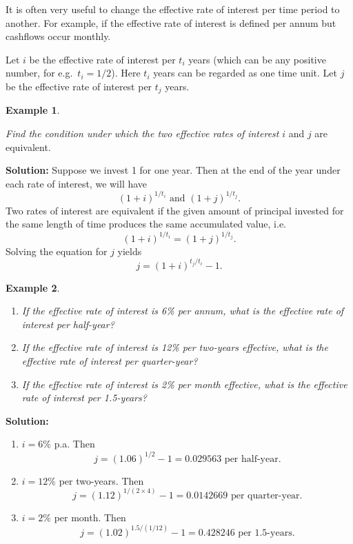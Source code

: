 \documentclass[landscape, 20pt]{extreport}
\theoremstyle{definition}
\theoremstyle{definition}
\newtheorem{example}{Example}[chapter]
\theoremstyle{definition}
\theoremstyle{definition}
\theoremstyle{remark}
\begin{document}
It is often very useful to change the effective rate of interest per
time period to another. For example, if the effective rate of interest
is defined per annum but cashflows occur monthly.

Let \(i\) be the effective rate of interest per \(t_i\) years (which can be
any positive number, for e.g.~\(t_i = 1/2\)). Here \(t_i\) years can be
regarded as one time unit. Let \(j\) be the effective rate of interest per
\(t_j\) years.

\newpage \begin{example}
\protect\hypertarget{exm:unlabeled-div-17}{}\label{exm:unlabeled-div-17}

\emph{Find the condition under which the two effective rates of interest} \(i\)
and \(j\) are equivalent.

\end{example}

\textbf{Solution:} Suppose we invest 1 for one year. Then at the end of the
year under each rate of interest, we will have
\[(1+i)^{1/t_i} \text{ and } (1+j)^{1/t_j}.\] Two rates of interest are
equivalent if the given amount of principal invested for the same length
of time produces the same accumulated value, i.e.
\[(1+i)^{1/t_i} = (1+j)^{1/t_j}.\] Solving the equation for \(j\) yields
\[j = (1+i)^{t_j/t_i} - 1.\]

\newpage \begin{example}
\protect\hypertarget{exm:unlabeled-div-18}{}\label{exm:unlabeled-div-18}

\begin{enumerate}
\def\labelenumi{\arabic{enumi}.}
\item
  \emph{If the effective rate of interest is 6\% per annum, what is the
  effective rate of interest per half-year?}
\item
  \emph{If the effective rate of interest is 12\% per two-years effective,
  what is the effective rate of interest per quarter-year?}
\item
  \emph{If the effective rate of interest is 2\% per month effective, what
  is the effective rate of interest per 1.5-years?}
\end{enumerate}

\end{example}

\textbf{Solution:}

\begin{enumerate}
\def\labelenumi{\arabic{enumi}.}
\item
  \(i = 6\%\) p.a. Then
  \[j = (1.06)^{1/2} -1 = 0.029563 \text{ per half-year}.\]
\item
  \(i = 12\%\) per two-years. Then
  \[j = (1.12)^{1/(2\times4)} -1 = 0.0142669 \text{ per quarter-year}.\]
\item
  \(i = 2\%\) per month. Then
  \[j = (1.02)^{1.5/(1/12)} -1 = 0.428246 \text{ per 1.5-years}.\]
\end{enumerate}
\end{document}
